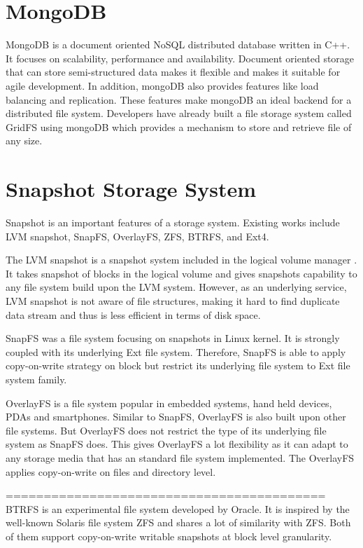\section{MongoDB}

    MongoDB is a document oriented NoSQL distributed database written in C++. It focuses on scalability, performance and availability. Document oriented storage that can store semi-structured data makes it flexible and makes it suitable for agile development. In addition, mongoDB also provides features like load balancing and replication. These features make mongoDB an ideal backend for a distributed file system. Developers have already built a file storage system called GridFS using mongoDB which provides a mechanism to store and retrieve file of any size.

\section{Snapshot Storage System}

    Snapshot is an important features of a storage system. Existing works include LVM snapshot, SnapFS, OverlayFS, ZFS, BTRFS, and Ext4.
    
    The LVM snapshot is a snapshot system included in the logical volume manager \cite{lvm}\cite{disk_perform_lvm}. It takes snapshot of blocks in the logical volume and gives snapshots capability to any file system build upon the LVM system. However, as an underlying service, LVM snapshot is not aware of file structures, making it hard to find duplicate data stream and thus is less efficient in terms of disk space.
    
    SnapFS was a file system focusing on snapshots in Linux kernel. \cite{snapfs} It is strongly coupled with its underlying Ext file system. Therefore, SnapFS is able to apply copy-on-write strategy on block but restrict its underlying file system to Ext file system family. 
    
    OverlayFS \cite{overlayfs} is a file system popular in embedded systems, hand held devices, PDAs and smartphones. Similar to SnapFS, OverlayFS is also built upon other file systems. But OverlayFS does not restrict the type of its underlying file system as SnapFS does. This gives OverlayFS a lot flexibility as it can adapt to any storage media that has an standard file system implemented. The OverlayFS applies copy-on-write on files and directory level.

    ==========================================
    BTRFS is an experimental file system developed by Oracle. It is inspired by the well-known Solaris file system ZFS and shares a lot of similarity with ZFS. Both of them support copy-on-write writable snapshots at block level granularity.
    
